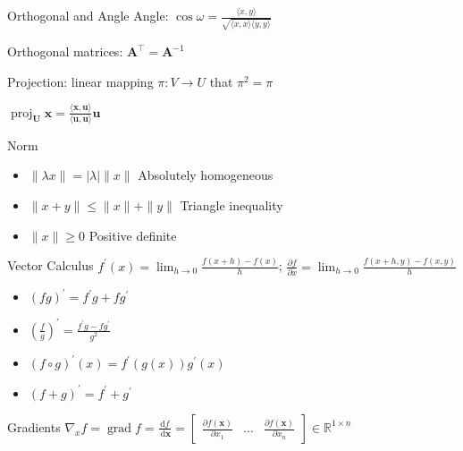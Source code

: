 \documentclass[UTF8,a4paper]{article}
\begin{document}
\begin{multicols}{3}
\begin{cheatsheetblock}{Orthogonal and Angle}
    Angle: \hfill $\cos \omega=\frac{\langle x, y\rangle}{\sqrt{\langle x, x\rangle\langle y, y\rangle}}$

    Orthogonal matrices: \hfill $\bm{A}^{\top} = \bm{A}^{-1}$

    Projection: linear mapping $\pi: V \rightarrow U$ that \hfill $\pi^{2}=\pi$

    \hfill $\operatorname{proj}_{\boldsymbol{U}} \boldsymbol{x}=\frac{\langle \boldsymbol{x}, \boldsymbol{u}\rangle}{\langle \boldsymbol{u}, \boldsymbol{u}\rangle} \boldsymbol{u}$
\end{cheatsheetblock}

\begin{cheatsheetblock}{Norm}
    \begin{itemize}
        \item $\|\lambda x\|=|\lambda| \|x\|$ \hfill Absolutely homogeneous
        \item $\|x+y\| \leq\|x\|+\|y\|$ \hfill Triangle inequality
        \item $\|x\| \geq 0$ \hfill Positive definite
    \end{itemize}
\end{cheatsheetblock}

\begin{cheatsheetblock} {Vector Calculus}
    $f^{\prime}(x)=\lim _{h \rightarrow 0} \frac{f(x+h)-f(x)}{h}$; \hfill $\frac{\partial f}{\partial x}=\lim _{h \rightarrow 0} \frac{f(x+h, y)-f(x, y)}{h}$

    \begin{itemize}
        \item $(f g)^{\prime}=f^{\prime} g+f g^{\prime}$ \hfill {}
        \item $\left(\frac{f}{g}\right)^{\prime}=\frac{f^{\prime} g-f g^{\prime}}{g^{2}}$ \hfill {}
        \item $(f \circ g)^{\prime}(x)=f^{\prime}(g(x)) g^{\prime}(x)$ \hfill {}
        \item $(f+g)^{\prime}=f^{\prime}+g^{\prime}$ \hfill {}
    \end{itemize}
\end{cheatsheetblock}

\begin{cheatsheetblock}{Gradients}
    $        \nabla_x f=\operatorname{grad} f=\frac{\mathrm{d} f}{\mathrm{~d} \boldsymbol{x}}=\left[\begin{array}{lll}
                \frac{\partial f(\boldsymbol{x})}{\partial x_1} & \ldots & \frac{\partial f(\boldsymbol{x})}{\partial x_n}
            \end{array}\right] \in \mathbb{R}^{1 \times n}$
\end{cheatsheetblock}


\end{multicols}
\end{document}
